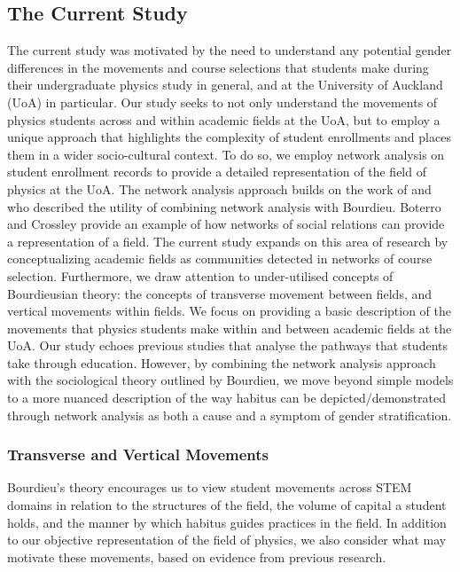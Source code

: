 \subsection*{The Current Study}

The current study was motivated by the need to understand any potential gender differences in the movements and course selections that students make during their undergraduate physics study in general, and at the University of Auckland (UoA) in particular. Our study seeks to not only understand the movements of physics students across and within academic fields at the UoA, but to employ a unique approach that highlights the complexity of student enrollments and places them in a wider socio-cultural context. To do so, we employ network analysis on student enrollment records to provide a detailed representation of the field of physics at the UoA. The network analysis approach builds on the work of\cite{de2003fields} and\cite{bottero2011worlds} who described the utility of combining network analysis with Bourdieu. Boterro and Crossley\cite{bottero2011worlds} provide an example of how networks of social relations can provide a representation of a field. The current study expands on this area of research by conceptualizing academic fields as communities detected in networks of course selection. Furthermore, we draw attention to under-utilised concepts of Bourdieusian theory: the concepts of transverse movement between fields, and vertical movements within fields. We focus on providing a basic description of the movements that physics students make within and between academic fields at the UoA. Our study echoes previous studies that analyse the pathways that students take through education. However, by combining the network analysis approach with the sociological theory outlined by Bourdieu\cite{Bourdieu1984}, we move beyond simple models to a more nuanced description of the way habitus can be depicted/demonstrated through network analysis as both a cause and a symptom of gender stratification. 

\subsubsection*{Transverse and Vertical Movements}
Bourdieu's theory encourages us to view student movements across STEM domains in relation to the structures of the field, the volume of capital a student holds, and the manner by which habitus guides practices in the field. In addition to our objective representation of the field of physics, we also consider what may motivate these movements, based on evidence from previous research.

